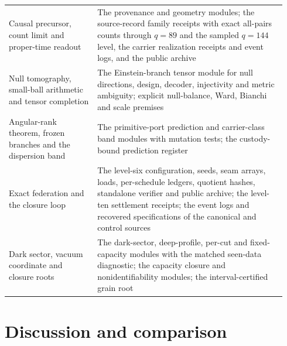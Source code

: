 \documentclass[11pt]{article}
\theoremstyle{definition}
\theoremstyle{remark}
\begin{document}
{\begin{longtable}{@{}L{0.30\linewidth}L{0.64\linewidth}@{}}
Causal precursor, count limit and proper-time readout & The provenance and
geometry modules; the source-record family receipts with exact all-pairs
counts through $q=89$ and the sampled $q=144$ level, the carrier realization
receipts and event logs, and the public archive\\
Null tomography, small-ball arithmetic and tensor completion & The
Einstein-branch tensor module for null directions, design, decoder,
injectivity and metric ambiguity; explicit null-balance, Ward, Bianchi and
scale premises\\
Angular-rank theorem, frozen branches and the dispersion band & The
primitive-port prediction and carrier-class band modules with mutation
tests; the custody-bound prediction register\\
Exact federation and the closure loop & The level-six configuration, seeds,
seam arrays, loads, per-schedule ledgers, quotient hashes, standalone
verifier and public archive; the level-ten settlement receipts; the event
logs and recovered specifications of the canonical and control sources\\
Dark sector, vacuum coordinate and closure roots & The dark-sector,
deep-profile, per-cut and fixed-capacity modules with the matched seen-data
diagnostic; the capacity closure and nonidentifiability modules; the
interval-certified grain root\\*
\bottomrule
\end{longtable}
}

\section{Discussion and comparison}
\label{sec:discussion}
\end{document}
